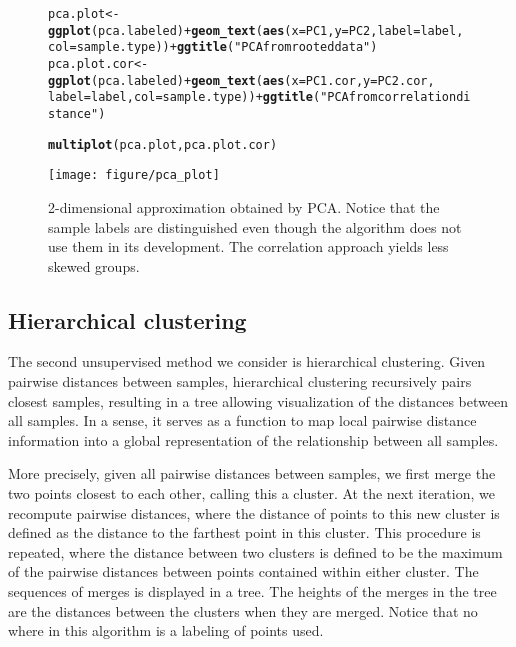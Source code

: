 \documentclass[12pt,english]{article}\usepackage{graphicx, color}
\makeatletter
\def\maxwidth{ %
  \ifdim\Gin@nat@width>\linewidth
    \linewidth
  \else
    \Gin@nat@width
  \fi
}
\newcommand{\hlfunctioncall}[1]{\textcolor[rgb]{0.501960784313725,0,0.329411764705882}{\textbf{#1}}}%
\newcommand{\hlstring}[1]{\textcolor[rgb]{0.6,0.6,1}{#1}}%
\newenvironment{kframe}{%
 \def\at@end@of@kframe{}%
 \ifinner\ifhmode%
  \def\at@end@of@kframe{\end{minipage}}%
  \begin{minipage}{\columnwidth}%
 \fi\fi%
 \def\FrameCommand##1{\hskip\@totalleftmargin \hskip-\fboxsep
 \colorbox{shadecolor}{##1}\hskip-\fboxsep
     \hskip-\linewidth \hskip-\@totalleftmargin \hskip\columnwidth}%
 \MakeFramed {\advance\hsize-\width
   \@totalleftmargin\z@ \linewidth\hsize
   \@setminipage}}%
 {\par\unskip\endMakeFramed%
 \at@end@of@kframe}
\newenvironment{knitrout}{}{} %
\numberwithin{equation}{section}
\numberwithin{figure}{section}
\theoremstyle{plain}
\theoremstyle{remark}
\makeatother
\begin{document}
\begin{spacing}{1}
  \begin{figure}
\begin{knitrout}
\color{fgcolor}\begin{kframe}
\begin{alltt}
pca.plot <- \hlfunctioncall{ggplot}(pca.labeled) + \hlfunctioncall{geom_text}(\hlfunctioncall{aes}(x = PC1, y = PC2, label = label, 
    col = sample.type)) + \hlfunctioncall{ggtitle}(\hlstring{"PCA from rooted data"})
pca.plot.cor <- \hlfunctioncall{ggplot}(pca.labeled) + \hlfunctioncall{geom_text}(\hlfunctioncall{aes}(x = PC1.cor, y = PC2.cor, 
    label = label, col = sample.type)) + \hlfunctioncall{ggtitle}(\hlstring{"PCA from correlation distance"})

\hlfunctioncall{multiplot}(pca.plot, pca.plot.cor)
\end{alltt}
\end{kframe}
\texttt{[image: figure/pca\_plot]} 

\end{knitrout}

\caption{2-dimensional approximation obtained by PCA. Notice that the
  sample labels are distinguished even though the algorithm does not
  use them in its development. The correlation approach yields less
  skewed groups.}
\label{fig:pca}
\end{figure}
\end{spacing}

\subsection{Hierarchical clustering}

The second unsupervised method we consider is hierarchical clustering.
Given pairwise distances between samples, hierarchical
clustering recursively pairs closest samples, resulting in a tree
allowing visualization of the distances between all samples. In a
sense, it serves as a function to map local pairwise distance
information into a global representation of the relationship between
all samples.

More precisely, given all pairwise distances between samples, we first
merge the two points closest to each other, calling this a cluster. At
the next iteration, we recompute pairwise distances, where the
distance of points to this new cluster is defined as the distance to the
farthest point in this cluster. This procedure is repeated, where
the distance between two clusters is defined to be the maximum of the
pairwise distances between points contained within either cluster. The
sequences of merges is displayed in a tree. The heights of the merges
in the tree are the distances between the clusters when they are
merged. Notice that no where in this algorithm is a labeling of points
used.
\end{document}
